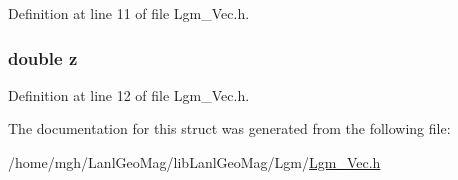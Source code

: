 Definition at line 11 of file Lgm\_\-Vec.h.\hypertarget{struct_lgm_position_b3e6ed577a7c669c19de1f9c1b46c872}{
\subsubsection[{z}]{\setlength{\rightskip}{0pt plus 5cm}double {\bf z}}}
\label{struct_lgm_position_b3e6ed577a7c669c19de1f9c1b46c872}




Definition at line 12 of file Lgm\_\-Vec.h.

The documentation for this struct was generated from the following file:\begin{CompactItemize}
\item 
/home/mgh/LanlGeoMag/libLanlGeoMag/Lgm/\hyperlink{_lgm___vec_8h}{Lgm\_\-Vec.h}\end{CompactItemize}
